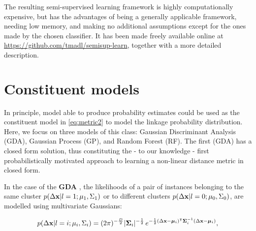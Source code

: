 The resulting semi-supervised learning framework is highly computationally expensive, but has the advantages of being a generally applicable framework, needing low memory, and making no additional assumptions except for the ones made by the chosen classifier. It has been made freely available online at \url{https://github.com/tmadl/semisup-learn}, together with a more detailed description.

\section{Constituent models}


In principle, model able to produce probability estimates could be used as the constituent model in \eqref{eq:metric2} to model the linkage probability distribution. Here, we focus on three models of this class: Gaussian Discriminant Analysis (GDA), Gaussian Process (GP), and Random Forest (RF). The first (GDA) has a closed form solution, thus constituting the - to our knowledge - first probabilistically motivated approach to learning a non-linear distance metric in closed form.


In the case of the \textbf{GDA} \citep{bensmail1996regularized}, the likelihoods of a pair of instances belonging to the same cluster $p( \Delta \textbf x | l=1; \mu_1, \Sigma_1)$ or to different clusters $p( \Delta \textbf x | l=0; \mu_0, \Sigma_0) $, are modelled using multivariate Gaussians:

\begin{equation}
\label{eq:gda}
p( \Delta \textbf x | l=i; \mu_i, \Sigma_i) = (2\pi)^{-\frac{D}{2}}|\boldsymbol\Sigma_i|^{-\frac{1}{2}}\, e^{ -\frac{1}{2}(\Delta \mathbf{x}-\boldsymbol\mu_i)^\intercal\boldsymbol\Sigma_i^{-1}(\Delta \mathbf{x}-\boldsymbol\mu_i) },
\end{equation}

